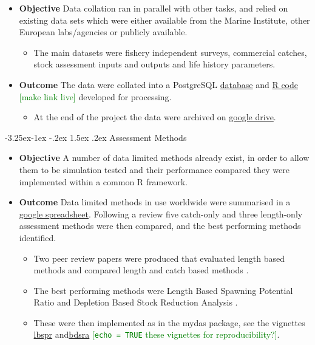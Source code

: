 \documentclass[a4paper, 10pt]{article}
\makeatletter
\newcommand{\coilin}{\textcolor{green}}
\renewcommand{\subsection}{\@startsection{subsection}{2}{\z@}%
 {-3.25ex\@plus -1ex \@minus -.2ex}%
 {1.5ex \@plus .2ex}%
 {\normalfont\bfseries\slshape}}
\makeatother
\begin{document}
\begin{itemize}[labelindent=\parindent,noitemsep,topsep=0pt,parsep=0pt,partopsep=0pt]
 \item \textbf{Objective} Data collation ran in parallel with other tasks, and relied on existing data sets which were either available from the Marine Institute, other European labs/agencies or publicly available. 
 \begin{itemize} \item The main datasets were fishery independent surveys, commercial catches, stock assessment inputs and outputs and life history parameters.
 \end{itemize}
 \item \textbf{Outcome} The data were collated into a PostgreSQL \hyperref[appendix:db]{database} and  \hyperref[appendix:datasets]{R code} \coilin{[make link live]} developed for processing. 
 \begin{itemize}
    \item At the end of the project the data were archived on \href{https://3o2y9wugzp1kfxr5hvzgzq-on.drv.tw/MyDas/db.html}{google drive}.
 \end{itemize}
\end{itemize}

\subsection{Assessment Methods}

\begin{itemize}[labelindent=\parindent,noitemsep,topsep=0pt,parsep=0pt,partopsep=0pt]
 \item \textbf{Objective} A number of data limited methods already exist, in order to allow them to be simulation tested and their performance compared they were implemented within a common R framework.    
 \item \textbf{Outcome} Data limited methods in use worldwide were summarised in a \href{https://docs.google.com/spreadsheets/d/17_qQdzDY41ZrL0yT6QtHpUR4_ydxx_xfCh4GiDqYymU/edit?usp=sharing}{google spreadsheet}. Following a review five catch-only and three length-only assessment methods were then compared, and the best performing methods identified.  
 \begin{itemize}
 \item Two peer review papers were produced that evaluated length based methods \citep{pons2019performance} and compared length and catch based methods \citep{pons2019catchlen}.
 \item  The best performing methods were Length Based Spawning Potential Ratio \citep[LBSPR][]{hordyk2014novel} and Depletion Based  Stock Reduction Analysis \citep[DBSRA][]{dick2011depletion}. 
 \item These were then implemented as in the mydas package, see the vignettes \href{https://3o2y9wugzp1kfxr5hvzgzq-on.drv.tw/MyDas/tasks/4/simtest-lbspr.html}{lbspr} and\href{https://3o2y9wugzp1kfxr5hvzgzq-on.drv.tw/MyDas/tasks/4/simtest-bdsra.html}{bdsra} \coilin{[\texttt{echo = TRUE} these vignettes for reproducibility?]}.
 \end{itemize}
\end{itemize}
\end{document}
